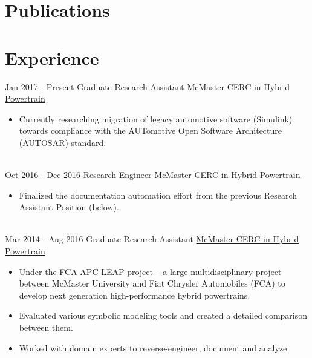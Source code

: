 \documentclass[letterpaper]{twentysecondcv} %
\begin{document}
\section{Publications}
 \vspace{2mm}


\section{Experience}

\begin{twenty} %
\twentyitem
  {Jan 2017 -}
  {Present}
  {Graduate Research Assistant}
  {%
  \href{http://hybrid.mcmaster.ca/}{McMaster CERC in Hybrid Powertrain}}
  {}
  {\begin{itemize}
    \item Currently researching migration of legacy automotive software
    (Simulink) towards compliance with the AUTomotive Open Software 
    Architecture (AUTOSAR) standard.
  \end{itemize}}
  \\
\twentyitem
  {Oct 2016 -}
  {Dec 2016}
  {Research Engineer}
  {\href{http://hybrid.mcmaster.ca/}{McMaster CERC in Hybrid Powertrain}}
  {}
  {\begin{itemize}
    \item Finalized the documentation automation effort from the previous
    Research Assistant Position (below).
  \end{itemize}}
  \\
\twentyitem
  {Mar 2014 -}
  {Aug 2016}
  {Graduate Research Assistant}
  {\href{http://hybrid.mcmaster.ca/}{McMaster CERC in Hybrid Powertrain}}
  {}
  {\begin{itemize}
    \item Under the FCA APC LEAP project -- a large multidisciplinary project
    between McMaster University and Fiat Chrysler Automobiles (FCA) to develop
    next generation high-performance hybrid powertrains.
    \item Evaluated various symbolic modeling tools and created a detailed
    comparison between them.
    \item Worked with domain experts to reverse-engineer, document and analyze

\end{itemize}}
\end{twenty}
\end{document}
